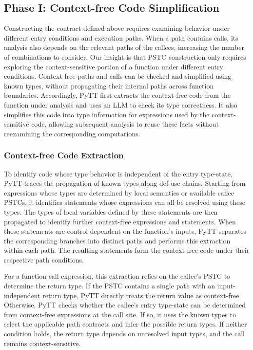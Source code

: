 \subsection{Phase I: Context-free Code Simplification}
\label{sec:extraction}

Constructing the contract defined above requires examining behavior under
different entry conditions and execution paths.
When a path contains calls, its analysis also depends on the relevant
paths of the callees, increasing the number of combinations to consider.
Our insight is that PSTC construction only requires exploring the
context-sensitive portion of a function under different entry conditions.
Context-free paths and calls can be checked and simplified using known
types, without propagating their internal paths across function boundaries.
Accordingly, PyTT first extracts the context-free code from the function
under analysis and uses an LLM to check its type correctness.
It also simplifies this code into type information for expressions used
by the context-sensitive code, allowing subsequent analysis to reuse
these facts without reexamining the corresponding computations.


\subsubsection{Context-free Code Extraction}

To identify code whose type behavior is independent of the entry
type-state, PyTT traces the propagation of known types along def-use
chains.
Starting from expressions whose types are determined by local semantics
or available callee PSTCs, it identifies statements whose expressions
can all be resolved using these types.
The types of local variables defined by these statements are then propagated
to identify further context-free expressions and statements.
When these statements are control-dependent on the function's inputs,
PyTT separates the corresponding branches into distinct paths and
performs this extraction within each path.
The resulting statements form the context-free code under their
respective path conditions.

For a function call expression, this extraction relies on the callee's
PSTC to determine the return type.
If the PSTC contains a single path with an input-independent return
type, PyTT directly treats the return value as context-free.
Otherwise, PyTT checks whether the callee's entry type-state can be
determined from context-free expressions at the call site.
If so, it uses the known types to select the applicable path contracts
and infer the possible return types.
If neither condition holds, the return type depends on unresolved
input types, and the call remains context-sensitive.

